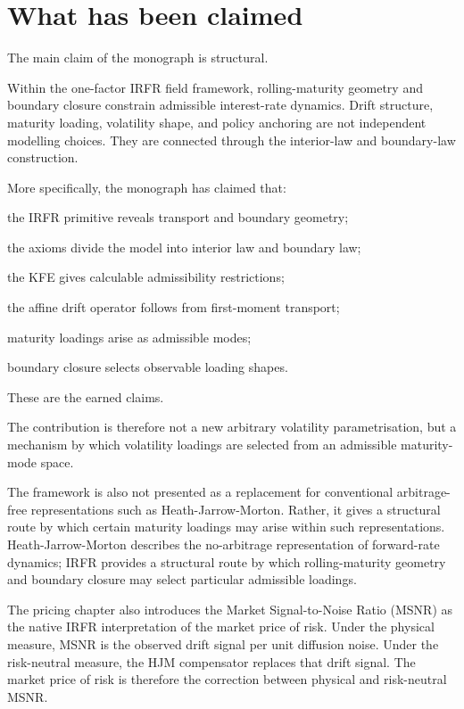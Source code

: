 \documentclass[11pt,oneside]{book}
\begin{document}
\section{What has been claimed}\label{what-has-been-claimed}

The main claim of the monograph is structural.

Within the one-factor IRFR field framework, rolling-maturity geometry
and boundary closure constrain admissible interest-rate dynamics. Drift
structure, maturity loading, volatility shape, and policy anchoring are
not independent modelling choices. They are connected through the
interior-law and boundary-law construction.

More specifically, the monograph has claimed that:

the IRFR primitive reveals transport and boundary geometry;

the axioms divide the model into interior law and boundary law;

the KFE gives calculable admissibility restrictions;

the affine drift operator follows from first-moment transport;

maturity loadings arise as admissible modes;

boundary closure selects observable loading shapes.

These are the earned claims.

The contribution is therefore not a new arbitrary volatility
parametrisation, but a mechanism by which volatility loadings are
selected from an admissible maturity-mode space.

The framework is also not presented as a replacement for conventional
arbitrage-free representations such as Heath-Jarrow-Morton. Rather, it
gives a structural route by which certain maturity loadings may
arise within such representations. Heath-Jarrow-Morton describes the
no-arbitrage representation of forward-rate dynamics; IRFR provides a structural route by which
rolling-maturity geometry and boundary closure may select particular
admissible loadings.

The pricing chapter also introduces the Market Signal-to-Noise Ratio (MSNR) as the native IRFR interpretation of the market price of risk. Under the physical measure, MSNR is the observed drift signal per unit diffusion noise. Under the risk-neutral measure, the HJM compensator replaces that drift signal. The market price of risk is therefore the correction between physical and risk-neutral MSNR.
\end{document}
